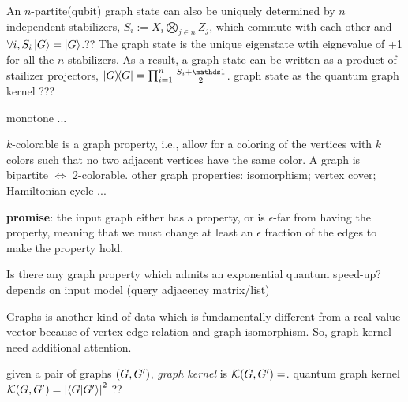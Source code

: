 	An $n$-partite(qubit) graph state can also be uniquely determined by $n$ independent stabilizers, 
	$S_i:= X_i \bigotimes_{j\in n}Z_j$, 
	which commute with each other and $\forall i,S_i\ket{G}=\ket{G}$.??
	The graph state is the unique eigenstate wtih eignevalue of +1 for all the $n$ stabilizers.
	As a result, a graph state can be written as a product of stailizer projectors, $\op{G}=\prod_{i=1}^n \frac{S_i +\identity}{2}$.
graph state as the quantum graph kernel ???


\begin{definition}\label{def:graph_property}
	monotone ...
\end{definition}
\begin{example}[colorable]\label{exm:colorable}
	$k$-colorable is a graph property, i.e., allow for a coloring of the vertices with $k$ colors such that no two adjacent vertices have the same color.
	A graph is bipartite $\iff$ 2-colorable.
	other graph properties: isomorphism; vertex cover; Hamiltonian cycle ...
\end{example}
\begin{problem}\label{prm:graph_property_test}
	\textbf{promise}: the input graph either has a property, or is $\epsilon$-far from having the property, meaning that we must change at least an $\epsilon$ fraction of the edges to make the property hold.
\end{problem}
\begin{theorem}
\end{theorem}
\begin{question}
	\cite{montanaroSurveyQuantumProperty2018}
	Is there any graph property which admits an exponential quantum speed-up?
	\cite{ben-davidSymmetriesGraphProperties2020}
	depends on input model (query adjacency matrix/list)
\end{question}
Graphs is another kind of data which is fundamentally different from a real value vector because of vertex-edge relation and graph isomorphism.
So, graph kernel \cite{kriegeSurveyGraphKernels2020} need additional attention.
\begin{definition}\label{def:graph_kernel}
	given a pair of graphs $(G,G')$,
	\emph{graph kernel} is $\mathcal{K} (G,G')  =$.
	quantum graph kernel $\kernel (\graph,\graph')  = \abs{\ip{\graph}{\graph'}}^2$ ??
	\cite{baiQuantumJensenShannon2015}	
\end{definition}
